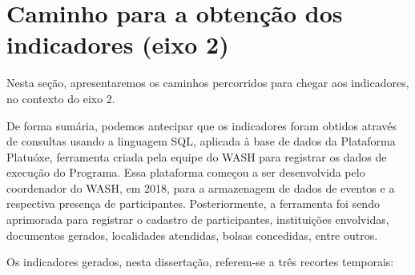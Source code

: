 \documentclass[
12pt,		%
openright,	%
twoside,  %
a4paper,			%
chapter=TITLE,		%
english,			%
french,				%
spanish,			%
brazil				%
]{USPSC-classe/USPSC}
\begin{document}
\section[Caminho para a obten\c{c}\~ao dos indicadores (eixo 2)]{Caminho para a obten\c{c}\~ao dos indicadores (eixo 2)}\label{Caminho para a obten\c{c}\~ao dos indicadores (eixo 2)}
Nesta se\c{c}\~ao, apresentaremos os caminhos percorridos para chegar aos indicadores, no contexto do eixo 2.









De forma sum\'aria, podemos antecipar que os indicadores foram obtidos atrav\'es de consultas usando a linguagem SQL, aplicada \`a base de dados da Plataforma Platu\'oxe, ferramenta criada pela equipe do WASH para registrar os dados de execu\c{c}\~ao do Programa. Essa plataforma come\c{c}ou a ser desenvolvida pelo coordenador do WASH, em 2018, para a armazenagem de dados de eventos e a respectiva presen\c{c}a de participantes. Posteriormente, a ferramenta foi sendo aprimorada para registrar o cadastro de participantes, institui\c{c}\~oes envolvidas, documentos gerados, localidades atendidas, bolsas concedidas, entre outros.









Os indicadores gerados, nesta disserta\c{c}\~ao, referem-se a tr\^es recortes temporais:
\end{document}
